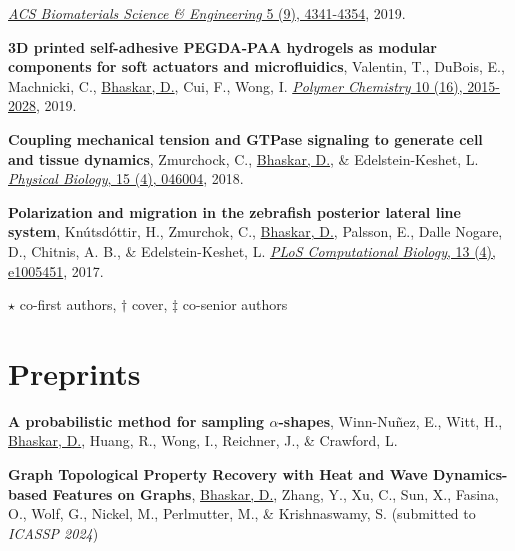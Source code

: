 \documentclass[margin,line]{res}
\begin{document}
\begin{resume}
{\begin{etaremune}[start=15]
\href{https://pubs.acs.org/doi/abs/10.1021/acsbiomaterials.9b00519}{\textit{ACS Biomaterials Science \& Engineering} 5 (9), 4341-4354}, 2019.
\vspace*{.1cm}
\item{\bf 3D printed self-adhesive PEGDA-PAA hydrogels as modular components for soft actuators and microfluidics}, 
Valentin, T., DuBois, E., Machnicki, C., \underline{Bhaskar, D.}, Cui, F., Wong, I. 
\href{https://pubs.rsc.org/ko/content/articlehtml/2019/py/c9py00211a}{\textit{Polymer Chemistry} 10 (16), 2015-2028}, 2019.
\vspace*{.1cm}
\item{\bf Coupling mechanical tension and GTPase signaling to generate cell and tissue dynamics}, 
Zmurchock, C., \underline{Bhaskar, D.}, \& Edelstein-Keshet, L. 
\href{https://iopscience.iop.org/article/10.1088/1478-3975/aab1c0/meta}{\textit{Physical Biology}, 15 (4), 046004}, 2018.
\vspace*{.1cm}
\item{\bf Polarization and migration in the zebrafish posterior lateral line system}, 
Kn\'{u}tsd\'{o}ttir, H., Zmurchok, C., \underline{Bhaskar, D.}, Palsson, E., Dalle Nogare, D., Chitnis, A. B., \& Edelstein-Keshet, L. 
\href{https://journals.plos.org/ploscompbiol/article?id=10.1371/journal.pcbi.1005451&rev=2}{\textit{PLoS Computational Biology}, 13 (4), e1005451}, 2017.
\item[] $\star$ co-first authors, $\dagger$ cover, $\ddagger$ co-senior authors
\end{etaremune}
}

\vspace*{.15cm}

\section{\sc Preprints}
{
\renewcommand\leftmargini{0em}
\renewcommand{\labelenumi}{P\theenumi}
\begin{etaremune}[start=6]
\item{\bf A probabilistic method for sampling $\alpha$-shapes},
Winn-Nu\~{n}ez, E., Witt, H., \underline{Bhaskar, D.}, Huang, R., Wong, I., Reichner, J., \& Crawford, L.
\vspace*{.1cm}
\item{\bf Graph Topological Property Recovery with Heat and Wave Dynamics-based Features on Graphs},
\underline{Bhaskar, D.}, Zhang, Y., Xu, C., Sun, X., Fasina, O., Wolf, G., Nickel, M., Perlmutter, M., \& Krishnaswamy, S. (submitted to \textit{ICASSP 2024})
\end{etaremune}
}


\end{resume}
\end{document}
